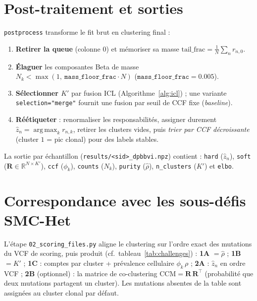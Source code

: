 \documentclass[11pt,a4paper]{article}
\DeclareMathOperator*{\argmax}{arg\,max}
\newcommand{\code}[1]{\texttt{#1}}
\newcommand{\Rmat}{\mathbf{R}}
\newcommand{\R}{\mathbb{R}}
\theoremstyle{remark}
\begin{document}
\section{Post-traitement et sorties}

\code{postprocess} transforme le fit brut en clustering final :
\begin{enumerate}[leftmargin=2.2em]
\item \textbf{Retirer la queue} (colonne $0$) et mémoriser sa masse
      $\text{tail\_frac}=\frac1N\sum_n r_{n,0}$.
\item \textbf{Élaguer} les composantes Beta de masse $N_k<\max(1,\ \code{mass\_floor\_frac}\cdot N)$
      ($\code{mass\_floor\_frac}=0.005$).
\item \textbf{Sélectionner $K'$} par fusion ICL (Algorithme~\ref{alg:icl}) ; une variante
      \code{selection="merge"} fournit une fusion par seuil de CCF fixe (\emph{baseline}).
\item \textbf{Réétiqueter} : renormaliser les responsabilités, assigner durement
      $\hat z_n=\argmax_k r_{n,k}$, retirer les clusters vides, puis \emph{trier par CCF
      décroissante} (cluster $1$ = pic clonal) pour des labels stables.
\end{enumerate}
La sortie par échantillon (\code{results/<sid>\_dpbbvi.npz}) contient : \code{hard}
($\hat z_n$), \code{soft} ($\Rmat\in\R^{N\times K'}$), \code{ccf} ($\phi_k$), \code{counts}
($N_k$), \code{purity} ($\hat\rho$), \code{n\_clusters} ($K'$) et \code{elbo}.

\section{Correspondance avec les sous-défis SMC-Het}

L'étape \code{02\_scoring\_files.py} aligne le clustering sur l'ordre exact des mutations du
VCF de scoring, puis produit (cf.\ tableau~\ref{tab:challenges}) :
\textbf{1A} $=\hat\rho$ ;
\textbf{1B} $=K'$ ;
\textbf{1C} : comptes par cluster + prévalence cellulaire $\phi_k\,\rho$ ;
\textbf{2A} : $\hat z_n$ en ordre VCF ;
\textbf{2B} (optionnel) : la matrice de co-clustering $\mathrm{CCM}=\Rmat\,\Rmat^{\!\top}$
(probabilité que deux mutations partagent un cluster). Les mutations absentes de la table
sont assignées au cluster clonal par défaut.
\end{document}
